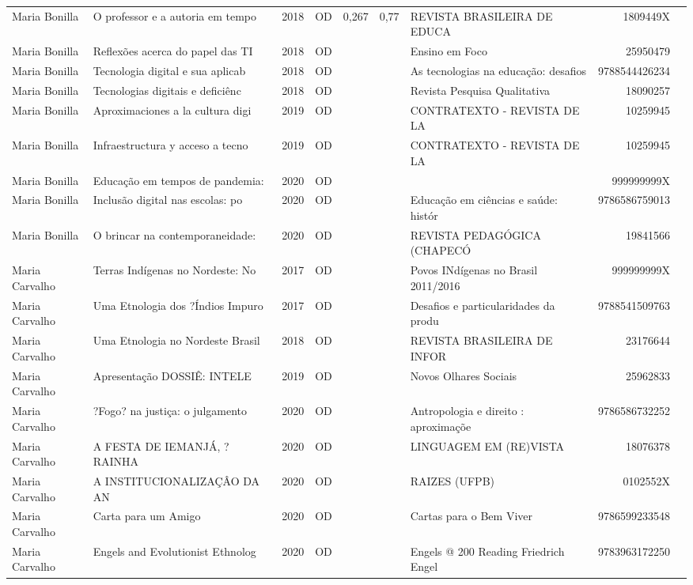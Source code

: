 \documentclass[12pt,brazil]{article}\usepackage[]{graphicx}\usepackage[]{xcolor}
\begin{document}
\begin{longtable}{lllrrllrr}
Maria Bonilla & O professor e a autoria em tempo & 2018 & OD & 0,267 & 0,77 & REVISTA BRASILEIRA DE EDUCA & 1809449X \\
Maria Bonilla & Reflexões acerca do papel das TI & 2018 & OD &  &  & Ensino em Foco & 25950479 \\
Maria Bonilla & Tecnologia digital e sua aplicab & 2018 & OD &  &  & As tecnologias na educação: desafios & 9788544426234 \\
Maria Bonilla & Tecnologias digitais e deficiênc & 2018 & OD &  &  & Revista Pesquisa Qualitativa & 18090257 \\
Maria Bonilla & Aproximaciones a la cultura digi & 2019 & OD &  &  & CONTRATEXTO - REVISTA DE LA & 10259945 \\
Maria Bonilla & Infraestructura y acceso a tecno & 2019 & OD &  &  & CONTRATEXTO - REVISTA DE LA & 10259945 \\
Maria Bonilla & Educação em tempos de pandemia:  & 2020 & OD &  &  &  & 999999999X \\
Maria Bonilla & Inclusão digital nas escolas: po & 2020 & OD &  &  & Educação em ciências e saúde: histór & 9786586759013 \\
Maria Bonilla & O brincar na contemporaneidade:  & 2020 & OD &  &  & REVISTA PEDAGÓGICA (CHAPECÓ & 19841566 \\
Maria Carvalho & Terras Indígenas no Nordeste: No & 2017 & OD &  &  & Povos INdígenas no Brasil 2011/2016 & 999999999X \\
Maria Carvalho & Uma Etnologia dos ?Índios Impuro & 2017 & OD &  &  & Desafios e particularidades da produ & 9788541509763 \\
Maria Carvalho & Uma Etnologia no Nordeste Brasil & 2018 & OD &  &  & REVISTA BRASILEIRA DE INFOR & 23176644 \\
Maria Carvalho & Apresentação DOSSIÊ: INTELE & 2019 & OD &  &  & Novos Olhares Sociais & 25962833 \\
Maria Carvalho & ?Fogo? na justiça: o julgamento  & 2020 & OD &  &  & Antropologia e direito : aproximaçõe & 9786586732252 \\
Maria Carvalho & A FESTA DE IEMANJÁ, ?RAINHA & 2020 & OD &  &  & LINGUAGEM EM (RE)VISTA & 18076378 \\
Maria Carvalho & A INSTITUCIONALIZAÇÂO DA AN & 2020 & OD &  &  & RAIZES (UFPB) & 0102552X \\
Maria Carvalho & Carta para um Amigo & 2020 & OD &  &  & Cartas para o Bem Viver & 9786599233548 \\
Maria Carvalho & Engels and Evolutionist Ethnolog & 2020 & OD &  &  & Engels @ 200 Reading Friedrich Engel & 9783963172250 \\

\end{longtable}
\end{document}
